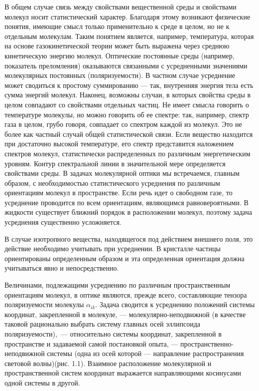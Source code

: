 В общем случае связь между свойствами вещественной среды и
свойствами молекул носит статистический характер. Благодаря этому
возникают физические понятия, имеющие смысл только применительно к
среде в целом, но не к отдельным молекулам. Таким понятием
является, например, температура, которая на основе
газокинетической теории может быть выражена через среднюю
кинетическую энергию молекул. Оптические постоянные среды
(например, показатель преломления) оказываются связанными с
усредненными значениями молекулярных постоянных (поляризуемости).
В частном случае усреднение может сводиться к простому
суммированию --- так, внутренняя энергия тела есть сумма энергий
молекул. Наконец, возможны случаи, в которых свойства среды в
целом совпадают со свойствами отдельных частиц. Не имеет смысла
говорить о температуре молекулы, но можно говорить об ее спектре:
так, например, спектр газа в целом, грубо говоря, совпадает со
спектром каждой из молекул. Это не более как частный случай общей
статистической  связи. Если вещество находится при достаточно
высокой температуре, его спектр представится наложением спектров
молекул, статистически распределенных по различным энергетическим
уровням. Контур спектральной линии в значительной мере
определяется свойствами среды. В задачах молекулярной оптики мы
встречаемся, главным образом, с необходимостью статистического
усреднения по различным ориентациям молекул в пространстве. Если
речь идет о свободном газе, то усреднение проводится по всем
ориентациям, являющимся равновероятными. В жидкости существует
ближний порядок в расположении молекул, поэтому задача усреднения
существенно усложняется.

В случае изотропного вещества, находящегося под действием внешнего
поля, это действие необходимо учитывать при усреднении. В
кристалле частицы ориентированы определенным образом и эта
определенная ориентация должна учитываться явно и непосредственно.

Величинами, подлежащими усреднению по различным пространственным
ориентациям молекул, в оптике являются, прежде всего, составляющие
тензора поляризуемости молекулы $\alpha_{ik}$. Задача сводится к
усреднению положений системы координат, закрепленной в молекуле,
--- молекулярно-неподвижной (в качестве таковой рационально
выбрать систему главных осей эллипсоида поляризуемости),~---
относительно системы координат, закрепленной в пространстве и
задаваемой самой постановкой опыта, --- пространственно-неподвижной
системы (одна из осей которой --- направление распространения
световой волны)(рис. 1.1). Взаимное расположение молекулярной и
пространственной систем координат выражается направляющими
косинусами одной системы в другой.\vskip -2mm

